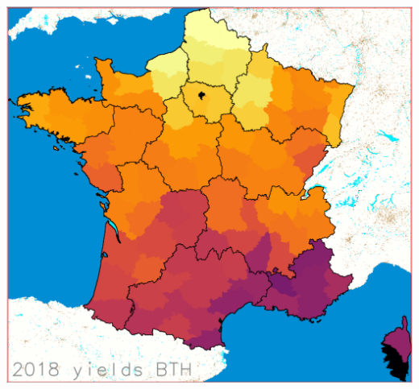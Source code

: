 \documentclass[landscape]{slides}
\begin{document}
\begin{slide} 
\includegraphics[width=\textwidth]{y2018}
\end{slide}
\end{document}

